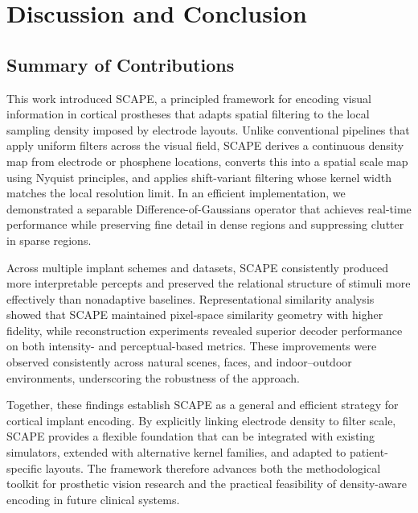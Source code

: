 \section{Discussion and Conclusion}

\subsection{Summary of Contributions}
This work introduced SCAPE, a principled framework for encoding visual information in cortical prostheses that adapts spatial filtering to the local sampling density imposed by electrode layouts. Unlike conventional pipelines that apply uniform filters across the visual field, SCAPE derives a continuous density map from electrode or phosphene locations, converts this into a spatial scale map using Nyquist principles, and applies shift-variant filtering whose kernel width matches the local resolution limit. In an efficient implementation, we demonstrated a separable Difference-of-Gaussians operator that achieves real-time performance while preserving fine detail in dense regions and suppressing clutter in sparse regions.

Across multiple implant schemes and datasets, SCAPE consistently produced more interpretable percepts and preserved the relational structure of stimuli more effectively than nonadaptive baselines. Representational similarity analysis showed that SCAPE maintained pixel-space similarity geometry with higher fidelity, while reconstruction experiments revealed superior decoder performance on both intensity- and perceptual-based metrics. These improvements were observed consistently across natural scenes, faces, and indoor–outdoor environments, underscoring the robustness of the approach.

Together, these findings establish SCAPE as a general and efficient strategy for cortical implant encoding. By explicitly linking electrode density to filter scale, SCAPE provides a flexible foundation that can be integrated with existing simulators, extended with alternative kernel families, and adapted to patient-specific layouts. The framework therefore advances both the methodological toolkit for prosthetic vision research and the practical feasibility of density-aware encoding in future clinical systems.


